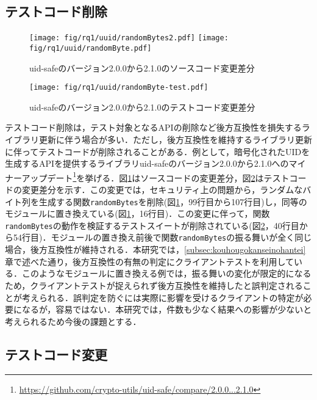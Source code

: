 \documentclass[submit]{ipsj}
\begin{document}
\subsection{テストコード削除}\label{subsec:delete-test}

\begin{figure}[t]
  \centering
  \texttt{[image: fig/rq1/uuid/randomBytes2.pdf]}
  \texttt{[image: fig/rq1/uuid/randomByte.pdf]}
  \caption{uid-safeのバージョン2.0.0から2.1.0のソースコード変更差分}
  \label{fig:rq1.delete-test-src}
\end{figure}

\begin{figure}[t]
  \centering
  \texttt{[image: fig/rq1/uuid/randomByte-test.pdf]}
  \caption{uid-safeのバージョン2.0.0から2.1.0のテストコード変更差分}
  \label{fig:rq1.delete-test-test}
\end{figure}

テストコード削除は，テスト対象となるAPIの削除など後方互換性を損失するライブラリ更新に伴う場合が多い．ただし，後方互換性を維持するライブラリ更新に伴ってテストコードが削除されることがある．例として，暗号化されたUIDを生成するAPIを提供するライブラリuid-safeのバージョン2.0.0から2.1.0へのマイナーアップデート\footnote{\url{https://github.com/crypto-utils/uid-safe/compare/2.0.0...2.1.0}}を挙げる．図\ref{fig:rq1.delete-test-src}はソースコードの変更差分，図\ref{fig:rq1.delete-test-test}はテストコードの変更差分を示す．この変更では，セキュリティ上の問題から，ランダムなバイト列を生成する関数{\verb|randomBytes|}を削除(図\ref{fig:rq1.delete-test-src}，99行目から107行目)し，同等のモジュールに置き換えている(図\ref{fig:rq1.delete-test-src}，16行目)．この変更に伴って，関数{\verb|randomBytes|}の動作を検証するテストスイートが削除されている(図\ref{fig:rq1.delete-test-test}，40行目から54行目)．モジュールの置き換え前後で関数{\verb|randomBytes|}の振る舞いが全く同じ場合，後方互換性が維持される．本研究では，\ref{subsec:kouhougokanseinohantei}章で述べた通り，後方互換性の有無の判定にクライアントテストを利用している．このようなモジュールに置き換える例では，振る舞いの変化が限定的になるため，クライアントテストが捉えられず後方互換性を維持したと誤判定されることが考えられる．誤判定を防ぐには実際に影響を受けるクライアントの特定が必要になるが，容易ではない\cite{detecting-locations-in-js}．本研究では，件数も少なく結果への影響が少ないと考えられるため今後の課題とする．

\subsection{テストコード変更}\label{subsec:change-test}
\end{document}
